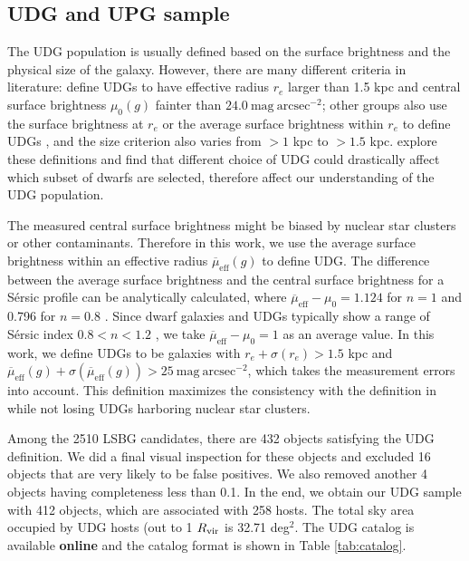 \documentclass[twocolumn,astrosymb,twocolappendix]{aastex631}
\newcommand{\sbunit}{\mathrm{mag\ arcsec}^{-2}}
\newcommand{\sbeff}{\overline{\mu}_{\mathrm{eff}}(g)}
\newcommand{\sersic}{S\'ersic}
\begin{document}
\begin{CJK*}{UTF8}{gbsn}
\subsection{UDG and UPG sample}\label{sec:sample}
The UDG population is usually defined based on the surface brightness and the physical size of the galaxy. However, there are many different criteria in literature: \citep{vanDokkum2015} define UDGs to have effective radius $r_e$ larger than 1.5 kpc and central surface brightness $\mu_0(g)$ fainter than $24.0\ \sbunit$; other groups also use the surface brightness at $r_e$ \citep[e.g.,][]{DiCintio2017,Cardona-Barrero2020} or the average surface brightness within $r_e$ to define UDGs \citep[e.g.,][]{Koda2015,Yagi2016,vdBurg2016,Leisman2017,Martin2019}, and the size criterion also varies from $>1$ kpc to $>1.5$ kpc. \citet{vanNest2022} explore these definitions and find that different choice of UDG could drastically affect which subset of dwarfs are selected, therefore affect our understanding of the UDG population.

The measured central surface brightness might be biased by nuclear star clusters \citep{Neumayer2020} or other contaminants. Therefore in this work, we use the average surface brightness within an effective radius $\sbeff$ to define UDG. The difference between the average surface brightness and the central surface brightness for a \sersic{} profile can be analytically calculated, where $\overline{\mu}_{\mathrm{eff}} - \mu_0 = 1.124$ for $n=1$ and 0.796 for $n=0.8$ \citep{Graham2005,Yagi2016}. Since dwarf galaxies and UDGs typically show a range of \sersic{} index $0.8 < n < 1.2$ \citep{vanDokkum2015,ELVES-I}, we take $\overline{\mu}_{\mathrm{eff}} - \mu_0 = 1$ as an average value. In this work, we define UDGs to be galaxies with $r_e+\sigma(r_e) > 1.5$ kpc and $\sbeff + \sigma(\sbeff) > 25\ \sbunit$, which takes the measurement errors into account. This definition maximizes the consistency with the definition in \citet{vanDokkum2015} while not losing UDGs harboring nuclear star clusters.

Among the 2510 LSBG candidates, there are 432 objects satisfying the UDG definition. We did a final visual inspection for these objects and excluded 16 objects that are very likely to be false positives. We also removed another 4 objects having completeness less than 0.1. In the end, we obtain our UDG sample with 412 objects, which are associated with 258 hosts. The total sky area occupied by UDG hosts (out to 1 $R_{\rm{vir}}$ is 32.71 deg$^{2}$. The UDG catalog is available \textbf{online} and the catalog format is shown in Table \ref{tab:catalog}. 


\end{CJK*}
\end{document}
